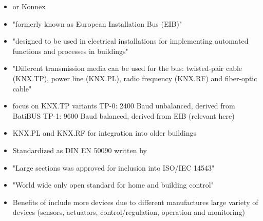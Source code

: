 	\begin{itemize}
		\item \knx or Konnex
		\item "formerly known as European Installation Bus (EIB)" \parencite{Merz2009}
		\item "designed to be used in electrical installations for implementing automated functions and processes in buildings" \parencite{Merz2009}
		\item "Different transmission media can be used for the bus: twisted-pair cable (KNX.TP), power line (KNX.PL), radio frequency (KNX.RF) and fiber-optic cable" \parencite{Merz2009}
		\item focus on KNX.TP
			 variants
			\subitem TP-0: 2400 Baud unbalanced, derived from BatiBUS \parencite{CENELEC2004}
			\subitem TP-1: 9600 Baud balanced, derived from EIB (relevant here) \parencite{CENELEC2004}
		\item KNX.PL and KNX.RF for integration into older buildings \parencite{Merz2009}
		\item Standardized as DIN EN 50090 written by \textcite{CENELEC2004}
		\item "Large sections was approved for inclusion into ISO/IEC 14543" \parencite{Merz2009}
		\item "World wide only open standard for home and building control" \parencite{Merz2009}
		\item Benefits of \knx include
			\subitem more devices due to different manufactures
			\subitem large variety of devices (sensors, actuators, control/regulation, operation and monitoring)
	\end{itemize}
	
